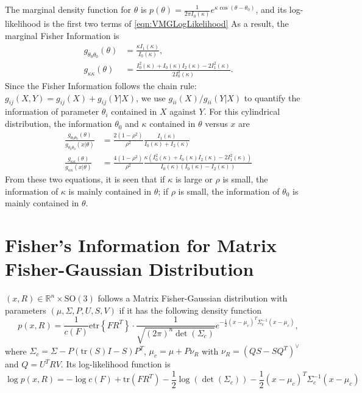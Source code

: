 \documentclass[10pt]{article}
\newcommand{\tr}[1]{\ensuremath{\mathrm{tr}\left( #1 \right)}}
\newcommand{\etr}[1]{\ensuremath{\mathrm{etr}\left\{ #1 \right\}}}
\newcommand{\SO}{\ensuremath{\mathrm{SO(3)}}}
\newcommand{\real}[1]{\ensuremath{\mathbb{R}^{ #1 }}}
\begin{document}
The marginal density function for $\theta$ is $p(\theta) = \frac{1}{2\pi I_0(\kappa)}e^{\kappa\cos(\theta-\theta_0)}$, and its log-likelihood is the first two terms of \eqref{eqn:VMGLogLikelihood}
As a result, the marginal Fisher Information is
\begin{align}
	g_{\theta_0\theta_0}(\theta) &= \frac{\kappa I_1(\kappa)}{I_0(\kappa)}, \\
	g_{\kappa\kappa}(\theta) &= \frac{I_0^2(\kappa)+I_0(\kappa)I_2(\kappa)-2I_1^2(\kappa)}{2I^2_0(\kappa)}.
\end{align}
Since the Fisher Information follows the chain rule: $g_{ij}(X,Y) = g_{ij}(X) + g_{ij}(Y|X)$, we use $g_{ii}(X)/g_{ii}(Y|X)$ to quantify the information of parameter $\theta_i$ contained in $X$ against $Y$.
For this cylindrical distribution, the information $\theta_0$ and $\kappa$ contained in $\theta$ versus $x$ are
\begin{align}
	\frac{g_{\theta_0\theta_0}(\theta)}{g_{\theta_0\theta_0}(x|\theta)} &= \frac{2(1-\rho^2)}{\rho^2} \frac{I_1(\kappa)}{I_0(\kappa)+I_2(\kappa)} \\
	\frac{g_{\kappa\kappa}(\theta)}{g_{\kappa\kappa}(x|\theta)} &= \frac{4(1-\rho^2)}{\rho^2} \frac{\kappa(I_0^2(\kappa)+I_0(\kappa)I_2(\kappa)-2I_1^2(\kappa))}{I_0(\kappa)(I_0(\kappa)-I_2(\kappa))}
\end{align}
From these two equations, it is seen that if $\kappa$ is large or $\rho$ is small, the information of $\kappa$ is mainly contained in $\theta$; if $\rho$ is small, the information of $\theta_0$ is mainly contained in $\theta$.

\section{Fisher's Information for Matrix Fisher-Gaussian Distribution}

$(x,R)\in\real{n}\times\SO$ follows a Matrix Fisher-Gaussian distribution with parameters $(\mu,\Sigma,P,U,S,V)$ if it has the following density function
\begin{equation}
	p(x,R) = \frac{1}{c(F)}\etr{FR^T} \cdot \frac{1}{\sqrt{(2\pi)^n\det(\Sigma_c)}}e^{-\frac{1}{2}(x-\mu_c)^T\Sigma_c^{-1}(x-\mu_c)},
\end{equation}
where $\Sigma_c = \Sigma-P(\tr{S}I-S)P^T$, $\mu_c = \mu+P\nu_R$ with $\nu_R = (QS-SQ^T)^\vee$ and $Q=U^TRV$.
Its log-likelihood function is
\begin{equation}
	\log p(x,R) = -\log c(F) + \tr{FR^T} - \frac{1}{2}\log(\det(\Sigma_c)) - \frac{1}{2}(x-\mu_c)^T\Sigma_c^{-1}(x-\mu_c)
\end{equation}
\end{document}
